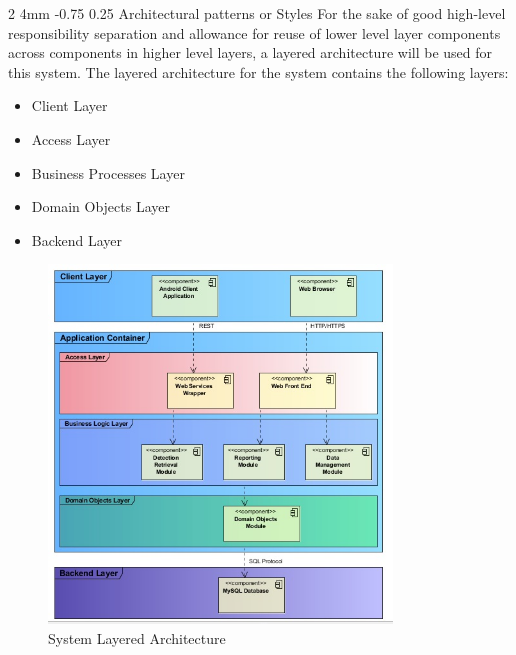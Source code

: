 \documentclass[12pt]{article}
\makeatletter
\renewcommand{\subsection}{\@startsection
   {subsection}%
   {2}%
   {4mm}%
   {-0.75\baselineskip}%
   {0.25\baselineskip}%
   {\rmfamily\normalfont\scshape\normalsize}}%
\makeatother
\begin{document}
                			  
                	\subsection{Architectural patterns or Styles}
                			For the sake of good high-level responsibility separation and allowance for reuse of lower level layer components across components in higher level layers, a layered architecture will be used for this system.
                			The layered architecture for the system contains the following layers:
                			\begin{itemize}
		                			\item Client Layer
		                			\item Access Layer
		                			\item Business Processes Layer
		                			\item Domain Objects Layer
		                			\item Backend Layer
                			\end{itemize} 
                			
                			
                			\begin{figure}[h]
                                   \centering
                                   \includegraphics[width=3.59in, height=3.75in]{Pictures/SystemArchitectureLayers.jpg}
                                   \caption{System Layered Architecture}
        					\end{figure}
        					\FloatBarrier
                			
\end{document}
